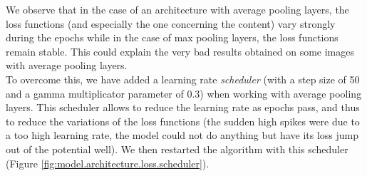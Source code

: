 \documentclass[twocolumn,superscriptaddress,aps,floatfix, nofootinbib]{revtex4-1}
\begin{document}
    We observe that in the case of an architecture with average pooling layers, the loss functions (and especially the one concerning the content) vary strongly during the epochs while in the case of max pooling layers, the loss functions remain stable. This could explain the very bad results obtained on some images with average pooling layers.\\
    
    To overcome this, we have added a learning rate \emph{scheduler} (with a step size of 50 and a gamma multiplicator parameter of 0.3) when working with average pooling layers. This scheduler allows to reduce the learning rate as epochs pass, and thus to reduce the variations of the loss functions (the sudden high spikes were due to a too high learning rate, the model could not do anything but have its loss jump out of the potential well). We then restarted the algorithm with this scheduler (Figure \ref{fig:model.architecture.loss.scheduler}).
    
\end{document}
